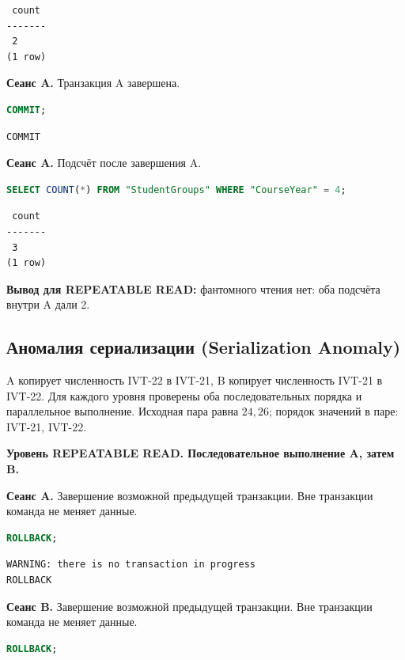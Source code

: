 \documentclass[12pt,a4paper]{article}
\begin{document}
\begin{lstlisting}
 count
-------
 2
(1 row)
\end{lstlisting}

\textbf{Сеанс A.} Транзакция A завершена.
\begin{lstlisting}[language=SQL]
COMMIT;
\end{lstlisting}

\begin{lstlisting}
COMMIT
\end{lstlisting}

\textbf{Сеанс A.} Подсчёт после завершения A.
\begin{lstlisting}[language=SQL]
SELECT COUNT(*) FROM "StudentGroups" WHERE "CourseYear" = 4;
\end{lstlisting}

\begin{lstlisting}
 count
-------
 3
(1 row)
\end{lstlisting}

\textbf{Вывод для REPEATABLE READ:} фантомного чтения нет: оба подсчёта внутри A дали 2.

\subsection*{Аномалия сериализации (Serialization Anomaly)}

A копирует численность IVT-22 в IVT-21, B копирует численность IVT-21 в IVT-22. Для каждого уровня проверены оба последовательных порядка и параллельное выполнение. Исходная пара равна \(24,26\); порядок значений в паре: IVT-21, IVT-22.

\textbf{Уровень REPEATABLE READ. Последовательное выполнение A, затем B.}

\textbf{Сеанс A.} Завершение возможной предыдущей транзакции. Вне транзакции команда не меняет данные.
\begin{lstlisting}[language=SQL]
ROLLBACK;
\end{lstlisting}

\begin{lstlisting}
WARNING: there is no transaction in progress
ROLLBACK
\end{lstlisting}

\textbf{Сеанс B.} Завершение возможной предыдущей транзакции. Вне транзакции команда не меняет данные.
\begin{lstlisting}[language=SQL]
ROLLBACK;
\end{lstlisting}
\end{document}
